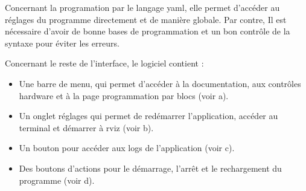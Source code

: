 Concernant la programation par le langage \gls{yaml}, elle permet d'accéder au réglages du programme directement et de manière globale. Par contre, Il est nécessaire d'avoir de bonne bases de programmation et un bon contrôle de la syntaxe pour éviter les erreurs.

Concernant le reste de l'interface, le logiciel contient :

\begin{itemize}
    \item Une barre de menu, qui permet d'accéder à la documentation, aux contrôles \gls{hardware} et à la page programmation par blocs (voir a).
    \item Un onglet réglages qui permet de redémarrer l'application, accéder au terminal et démarrer à \gls{rviz} (voir b).
    \item Un bouton pour accéder aux \gls{logs} de l'application (voir c).
    \item Des boutons d'actions pour le démarrage, l'arrêt et le rechargement du programme (voir d).
\end{itemize}


